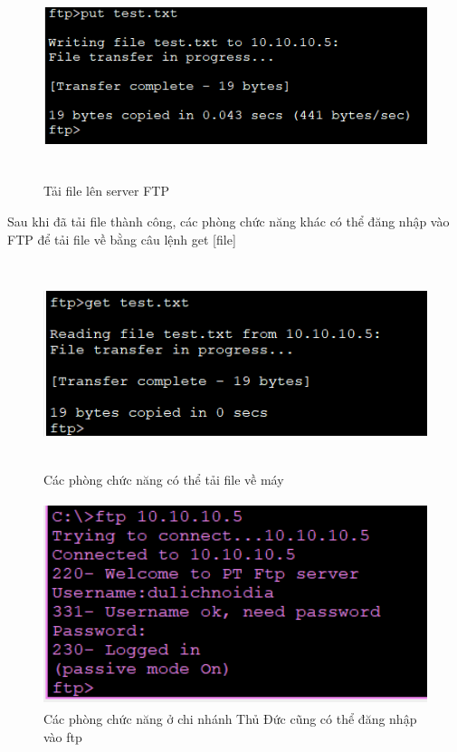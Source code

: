 \documentclass[a4paper, 12pt]{article}
\begin{document}
\begin{figure}[H]
    \centering
    \includegraphics[width=12cm, height=6cm]{img/4.3.2d.png}
    \caption{Tải file lên server FTP}
    \label{hinh423d}
\end{figure}
\hspace*{0.25cm}Sau khi đã tải file thành công, các phòng chức năng khác có thể đăng nhập vào FTP để tải file về bằng câu lệnh get [file]\\
\begin{figure}[H]
    \centering
    \includegraphics[width=12cm, height=6cm]{img/4.2.3e.png}
    \caption{Các phòng chức năng có thể tải file về máy}
    \label{hinh423e}
\end{figure}

\begin{figure}[H]
    \centering
    \includegraphics[width=12cm, height=6cm]{img/4.2.3f.png}
    \caption{Các phòng chức năng ở chi nhánh Thủ Đức cũng có thể đăng nhập vào ftp}
    \label{hinh423f}
\end{figure}
\end{document}
